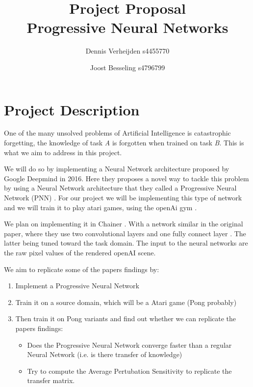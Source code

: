 \documentclass{article}
\title{Project Proposal \\ Progressive Neural Networks}
\author{Dennis Verheijden s4455770 \and Joost Besseling s4796799}
\begin{document}
\maketitle
\section*{Project Description}
One of the many unsolved problems of Artificial Intelligence is catastrophic forgetting, the knowledge of task \textit{A} is forgotten when trained on task \textit{B}. This is what we aim to address in this project.

We will do so by implementing a Neural Network architecture proposed by Google Deepmind in 2016. Here they proposes a novel way to tackle this problem by using a Neural Network architecture that they called a Progressive Neural Network (PNN) \cite{rusu2016progressive}. For our project we will be implementing this type of network and we will train it to play atari games, using the openAi gym \cite{1606.01540}.

We plan on implementing it in Chainer \cite{chainer_learningsys2015}. With a network similar in the original paper, where they use two convolutional layers and one fully connect layer \cite{1606.01540}. The latter being tuned toward the task domain. The input to the neural networks are the raw pixel values of the rendered openAI scene.

We aim to replicate some of the papers findings by:
\begin{enumerate}[1.]
\item Implement a Progressive Neural Network
\item Train it on a source domain, which will be a Atari game (Pong probably)
\item Then train it on Pong variants and find out whether we can replicate the papers findings:
    \begin{itemize}
    \item Does the Progressive Neural Network converge faster than a regular Neural Network (i.e. is there transfer of knowledge)
    \item Try to compute the Average Pertubation Sensitivity to replicate the transfer matrix.
    \end{itemize}
\end{enumerate}



\end{document}
